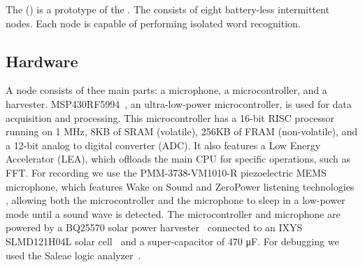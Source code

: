 
The \fullcim (\cim) is a prototype of the \fullcis. The \cim consists of eight battery-less intermittent nodes. Each node is capable of performing isolated word recognition. 



\subsection{Hardware}
\label{sec:hardware}
A \cim node consists of thee main parts: a microphone, a microcontroller, and a harvester. MSP430RF5994~\cite{ti_msp430_website}, an ultra-low-power microcontroller, is used for data acquisition and processing. This microcontroller has a 16-bit RISC processor running on 1 MHz, 8KB of SRAM (volatile), 256KB of FRAM (non-volatile), and a 12-bit analog to digital converter (ADC). It also features a Low Energy Accelerator (LEA), which offloads the main CPU for specific operations, such as FFT. For recording we use the PMM-3738-VM1010-R piezoelectric MEMS microphone, which features Wake on Sound and ZeroPower listening technologies \cite{microphone}, allowing both the microcontroller and the microphone to sleep in a low-power mode until a sound wave is detected.
The microcontroller and microphone are powered by a BQ25570 solar power harvester~\cite{BQ25570EVM-206_website} connected to an IXYS SLMD121H04L solar cell~\cite{SLMD121H04L_website} and a super-capacitor of 470 \si{\micro F}. For debugging we used the Saleae logic analyzer~\cite{saleae}.

